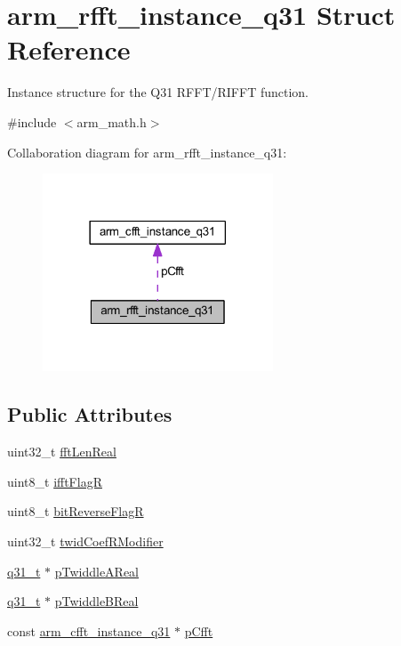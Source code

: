 \hypertarget{structarm__rfft__instance__q31}{}\section{arm\+\_\+rfft\+\_\+instance\+\_\+q31 Struct Reference}
\label{structarm__rfft__instance__q31}


Instance structure for the Q31 R\+F\+F\+T/\+R\+I\+F\+FT function.  




{\ttfamily \#include $<$arm\+\_\+math.\+h$>$}



Collaboration diagram for arm\+\_\+rfft\+\_\+instance\+\_\+q31\+:
\nopagebreak
\begin{figure}[H]
\begin{center}
\leavevmode
\includegraphics[width=194pt]{structarm__rfft__instance__q31__coll__graph}
\end{center}
\end{figure}
\subsection*{Public Attributes}
\begin{DoxyCompactItemize}
\item 
uint32\+\_\+t \hyperlink{structarm__rfft__instance__q31_af777b0cadd5abaf064323692c2e6693b}{fft\+Len\+Real}
\item 
uint8\+\_\+t \hyperlink{structarm__rfft__instance__q31_af5c2615e6cde15524df38fa57ea32d94}{ifft\+FlagR}
\item 
uint8\+\_\+t \hyperlink{structarm__rfft__instance__q31_a3cb90cdc928a88b0203917dcb3dc1b71}{bit\+Reverse\+FlagR}
\item 
uint32\+\_\+t \hyperlink{structarm__rfft__instance__q31_a6fc90252b579f7c29e01bd279334fc43}{twid\+Coef\+R\+Modifier}
\item 
\hyperlink{arm__math_8h_adc89a3547f5324b7b3b95adec3806bc0}{q31\+\_\+t} $\ast$ \hyperlink{structarm__rfft__instance__q31_a2a0c944e66bab92fcbe19d1c29153250}{p\+Twiddle\+A\+Real}
\item 
\hyperlink{arm__math_8h_adc89a3547f5324b7b3b95adec3806bc0}{q31\+\_\+t} $\ast$ \hyperlink{structarm__rfft__instance__q31_ae5070be4c2e0327e618f5e1f4c5b9d80}{p\+Twiddle\+B\+Real}
\item 
const \hyperlink{structarm__cfft__instance__q31}{arm\+\_\+cfft\+\_\+instance\+\_\+q31} $\ast$ \hyperlink{structarm__rfft__instance__q31_a8fe10d425b59e096c23aa4bb5caa1974}{p\+Cfft}
\end{DoxyCompactItemize}


